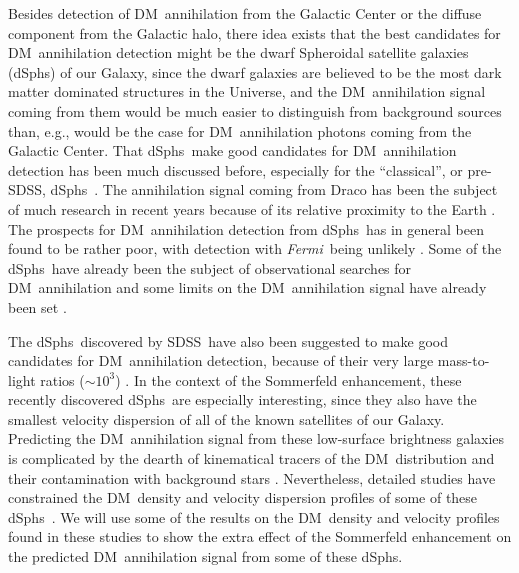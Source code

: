\documentclass[aps,prd,twocolumn,amsmath,amssymb,floatfix,nofootinbib,10pt]{revtex4}
\newcommand{\eg}{e.g.}
\newcommand{\Fermi}{\emph{Fermi}}
\newcommand{\DM}{DM}
\newcommand{\dSphs}{dSphs}
\newcommand{\SDSS}{SDSS}
\begin{document}
Besides detection of \DM\ annihilation from the Galactic Center or the
diffuse component from the Galactic halo, there idea exists that the
best candidates for \DM\ annihilation detection might be the dwarf
Spheroidal satellite galaxies (\dSphs) of our Galaxy, since the dwarf
galaxies are believed to be the most dark matter dominated structures
in the Universe, and the \DM\ annihilation signal coming from them
would be much easier to distinguish from background sources than, \eg,
would be the case for \DM\ annihilation photons coming from the
Galactic Center. That \dSphs\ make good candidates for \DM\
annihilation detection has been much discussed before, especially for
the ``classical'', or pre-\SDSS, \dSphs\
\cite{2000PhRvD..61b3514B,2002PhRvD..66b3509T,2004PhRvD..70b3512B,2004PhRvD..69l3501E,2004PhRvD..70d3503P,2004PhRvL..93p1302H}. The
annihilation signal coming from Draco has been the subject of much
research in recent years because of its relative proximity to the
Earth
\cite{2002PhRvD..66b3509T,2004PhRvD..70d3503P,2006PhRvD..73f3510B,2006JCAP...03..003P,2007PhRvD..75b3513C,2007PhRvD..76l3509S,2007PhRvD..75h3526S,2008arXiv0812.1494P}. The
prospects for \DM\ annihilation detection from \dSphs\ has in general
been found to be rather poor, with detection with \Fermi\ being
unlikely \cite{2008arXiv0812.1494P,2009arXiv0902.4330P}. Some of the
\dSphs\ have already been the subject of observational searches for
\DM\ annihilation and some limits on the \DM\ annihilation signal have
already been set
\cite{2008ApJ...678..594W,2008ApJ...679..428A,2008APh....29...55A,2008PhRvD..78h7101D,2009ApJ...691..175A,2008arXiv0810.3561M}.








The \dSphs\ discovered by \SDSS\ have also been suggested to make good
candidates for \DM\ annihilation detection, because of their very
large mass-to-light ratios ($\sim\!10^3$)
\cite{2008ApJ...678..614S,2008arXiv0809.2781G}. In the context of the
Sommerfeld enhancement, these recently discovered \dSphs\ are
especially interesting, since they also have the smallest velocity
dispersion of all of the known satellites of our Galaxy. Predicting
the \DM\ annihilation signal from these low-surface brightness
galaxies is complicated by the dearth of kinematical tracers of the
\DM\ distribution and their contamination with background stars
\cite{2009AJ....137.3109W}. Nevertheless, detailed studies have
constrained the \DM\ density and velocity dispersion profiles of some
of these \dSphs\
\cite{2007PhRvD..75h3526S,2007ApJ...667L..53W,2008ApJ...672..904P}. We
will use some of the results on the \DM\ density and velocity profiles
found in these studies to show the extra effect of the Sommerfeld
enhancement on the predicted \DM\ annihilation signal from some of
these \dSphs.
\end{document}
